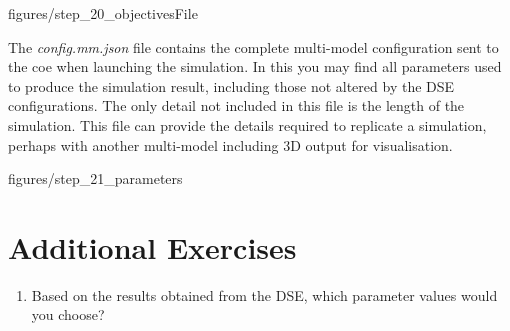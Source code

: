 \documentclass[11pt,a4paper]{../tutorial}
\begin{document}
\begin{instructions}
\begin{center}\begin{annotation}[width=0.7\linewidth,trim=0 0 0 0,clip]{figures/step_20_objectivesFile}
    \end{annotation}\end{center}


The \emph{config.mm.json} file contains the complete multi-model configuration sent to the coe when launching the simulation.  In this you may find all parameters used to produce the simulation result, including those not altered by the DSE configurations.  The only detail not included in this file is the length of the simulation. This file can provide the details required to replicate a simulation, perhaps with another multi-model including 3D output for visualisation.

\begin{center}\begin{annotation}[width=0.7\linewidth,trim=0 0 0 0,clip]{figures/step_21_parameters}
    \end{annotation}\end{center}

\end{instructions}


\section{Additional Exercises}

\begin{enumerate}
	\item Based on the results obtained from the DSE, which parameter values would you choose?
\end{enumerate}
\end{document}
